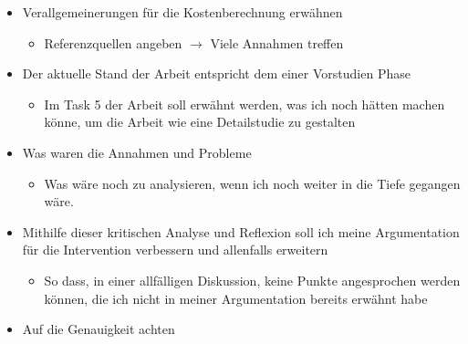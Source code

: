 \documentclass[
  paper=a4,                         %
  fontsize=11pt,                    %
  DIV=12,                           %
  BCOR=10mm,                        %
  twoside=true,                     %
  parskip=half,                     %
  headings=small,                   %
 ]{scrartcl}
\begin{document}
\begin{itemize}
\item Verallgemeinerungen für die Kostenberechnung erwähnen
\begin{itemize}
\item Referenzquellen angeben $\rightarrow$ Viele Annahmen treffen
\end{itemize}
\end{itemize}

\begin{itemize}
\item Der aktuelle Stand der Arbeit entspricht dem einer Vorstudien Phase \\
\begin{itemize}
\item Im Task 5 der Arbeit soll erwähnt werden, was ich noch hätten machen könne, um die Arbeit wie eine Detailstudie zu gestalten
\end{itemize}
\end{itemize}

\begin{itemize}
\item Was waren die Annahmen und Probleme \\ 
\begin{itemize}
\item Was wäre noch zu analysieren, wenn ich noch weiter in die Tiefe gegangen wäre.
\end{itemize}
\end{itemize}


\begin{itemize}
\item Mithilfe dieser kritischen Analyse und Reflexion soll ich meine Argumentation für die Intervention verbessern und allenfalls erweitern
\begin{itemize}
\item So dass, in einer allfälligen Diskussion, keine Punkte angesprochen werden können, die ich nicht in meiner Argumentation bereits erwähnt habe
\end{itemize}
\end{itemize}

\begin{itemize}
\item Auf die Genauigkeit achten
\end{itemize}


\newpage


%

%

\end{document}
